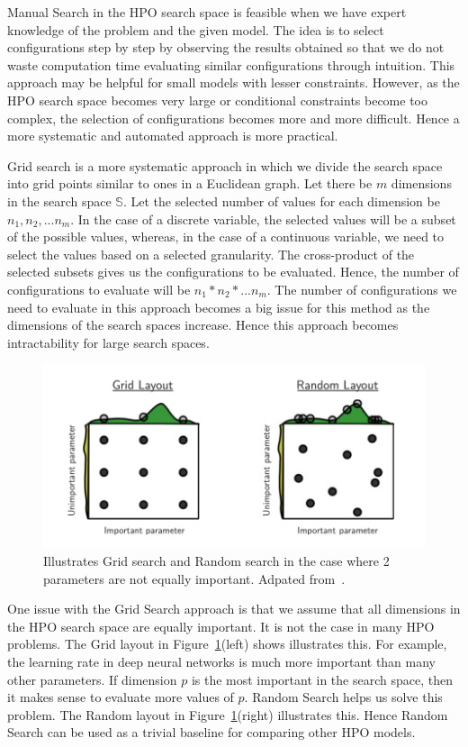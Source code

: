 \documentclass[12pt, twoside, ngerman]{report}
\begin{document}
Manual Search in the HPO search space is feasible when we have expert knowledge of the problem and the given model. 
The idea is to select configurations step by step by observing the results obtained
so that we do not waste computation time evaluating similar configurations through intuition.
This approach may be helpful for small models with lesser constraints.
However, as the HPO search space becomes very large or conditional constraints become too complex, the selection of configurations becomes more and more difficult.
Hence a more systematic and automated approach is more practical.

Grid search is a more systematic approach in which we divide the search space into grid points similar to ones in a Euclidean graph.
Let there be $m$ dimensions in the search space $\mathbb{S}$. Let the selected number of values for each dimension be $n_1, n_2, ... n_m$. In the case of a discrete variable, the selected values will be a subset of the possible values, whereas, in the case of a continuous variable, we need to select the values based on a selected granularity.
The cross-product of the selected subsets gives us the configurations to be evaluated. Hence, the number of configurations to evaluate will be $n_1 * n_2 * ... n_m$.
The number of configurations we need to evaluate in this approach becomes a big issue for this method as the dimensions of the search spaces increase.
Hence this approach becomes intractability for large search spaces.

\begin{figure}[htb]
  \centering
    \includegraphics[scale=0.8]{images/rsgsexample}
    \caption{Illustrates Grid search and Random search in the case where 2 parameters are not equally important.  Adpated from~\cite{rshpoarticle}.}
    \label{fig:rshpofig}
\end{figure}

One issue with the Grid Search approach is that we assume that all dimensions in the HPO search space are equally important. It is not the case in many HPO problems.  The Grid layout in Figure~\ref{fig:rshpofig}(left) shows illustrates this.  For example, the learning rate in deep neural networks is much more important than many other parameters. If dimension $p$ is the most important in the search space, then it makes sense to evaluate more values of $p$. Random Search helps us solve this problem. 
The Random layout in Figure~\ref{fig:rshpofig}(right) illustrates this. 
Hence Random Search can be used as a trivial baseline for comparing other HPO models.
\end{document}
